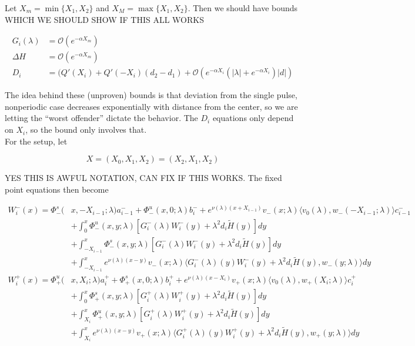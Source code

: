 \documentclass[12pt]{article}
\begin{document}
Let $X_m = \min\{ X_1, X_2 \}$ and $X_M = \max\{ X_1, X_2 \}$. Then we should have bounds WHICH WE SHOULD SHOW IF THIS ALL WORKS

\begin{align*}
G_i(\lambda) &= \mathcal{O}(e^{-\alpha X_m}) \\
\Delta H &= \mathcal{O}(e^{-\alpha X_m}) \\
D_i &= ( Q'(X_i) + Q'(-X_i)(d_2 - d_1 ) + \mathcal{O} \left( e^{-\alpha X_i} \left( |\lambda| +  e^{-\alpha X_i}  \right) |d| \right)
\end{align*}

The idea behind these (unproven) bounds is that deviation from the single pulse, nonperiodic case decreases exponentially with distance from the center, so we are letting the ``worst offender'' dictate the behavior. The $D_i$ equations only depend on $X_i$, so the bound only involves that. \\

For the setup, let

\[
X = (X_0, X_1, X_2) = (X_2, X_1, X_2)
\]

YES THIS IS AWFUL NOTATION, CAN FIX IF THIS WORKS. The fixed point equations then become

\begin{align*}
W_i^-(x) = \Phi^s_-(&x, -X_{i-1}; \lambda)a_{i-1}^- + \Phi^u_-(x, 0; \lambda)b_i^- + e^{\nu(\lambda)(x+X_{i-1})} v_-(x; \lambda) \langle v_0(\lambda), w_-(-X_{i-1}; \lambda) \rangle c_{i-1}^- \\
&+ \int_0^x \Phi^u_-(x, y; \lambda)[ G_i^-(\lambda)W_i^-(y) + \lambda^2 d_i \tilde{H}(y) ] dy \\
&+ \int_{-X_{i-1}}^x \Phi^s_-(x, y; \lambda) [ G_i^-(\lambda)W_i^-(y) + \lambda^2 d_i \tilde{H}(y) ] dy \\
&+ \int_{-X_{i-1}}^x 
e^{\nu(\lambda)(x-y)} v_-(x; \lambda) \langle G_i^-(\lambda)(y)W_i^-(y) + \lambda^2 d_i \tilde{H}(y), w_-(y; \lambda) \rangle dy \\
W_i^+(x) = \Phi^u_+(&x, X_i; \lambda)a_i^+ + \Phi^s_+(x, 0; \lambda)b_i^+ + e^{\nu(\lambda)(x - X_i)} v_+(x; \lambda) \langle v_0(\lambda), w_+(X_i; \lambda) \rangle c_i^+ \\
&+ \int_0^x \Phi^s_+(x, y; \lambda) [ G_i^+(\lambda)W_i^+(y) + \lambda^2 d_i \tilde{H}(y) ] dy \\
&+ \int_{X_i}^x \Phi^u_+(x, y; \lambda) [ G_i^+(\lambda)W_i^+(y) + \lambda^2 d_i \tilde{H}(y) ] dy \\
&+ \int_{X_i}^x e^{\nu(\lambda)(x-y)} v_+(x; \lambda) \langle G_i^+(\lambda)(y)W_i^+(y) + \lambda^2 d_i \tilde{H}(y), w_+(y; \lambda) \rangle dy
\end{align*}
\end{document}
